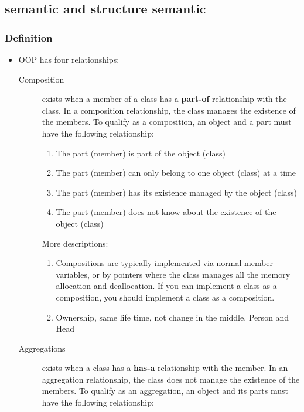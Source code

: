 \documentclass[a4paper,11pt,twoside]{book}
\begin{document}
\subsection{semantic and structure semantic}
\subsubsection{Definition}
\begin{itemize}
	\item OOP has four relationships:
	\begin{description}
		\item[Composition ] exists when a member of a class has a \textbf{part-of} relationship with the class. In a composition relationship, the class manages the existence of the members. To qualify as a composition, an object and a part must have the following relationship:
		\begin{enumerate}
			\item The part (member) is part of the object (class)
			\item The part (member) can only belong to one object (class) at a time
			\item The part (member) has its existence managed by the object (class)
			\item The part (member) does not know about the existence of the object (class)
		\end{enumerate}
	More descriptions: 
	\begin{enumerate}
		\item Compositions are typically implemented via normal member variables, or by pointers where the class manages all the memory allocation and deallocation. If you can implement a class as a composition, you should implement a class as a composition.
		\item  Ownership, same life time,  not change in the middle. Person and Head
	\end{enumerate}
	
	
	\item[Aggregations ] exists when a class has a \textbf{has-a} relationship with the member. In an aggregation relationship, the class does not manage the existence of the members. To qualify as an aggregation, an object and its parts must have the following relationship:
	

\end{description}
\end{itemize}
\end{document}
